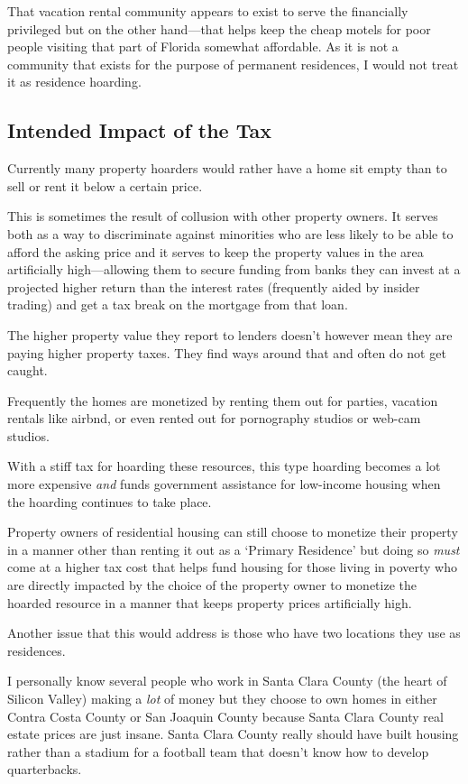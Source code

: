 That vacation rental community appears to exist to serve the financially privileged but on the other hand---that helps keep the cheap motels for poor people visiting that part of Florida somewhat affordable. As it is not a community that exists for the purpose of permanent residences, I would not treat it as residence hoarding.

\subsection{Intended Impact of the Tax}

Currently many property hoarders would rather have a home sit empty than to sell or rent it below a certain price.

This is sometimes the result of collusion with other property owners. It serves both as a way to discriminate against minorities who are less likely to be able to afford the asking price and it serves to keep the property values in the area artificially high---allowing them to secure funding from banks they can invest at a projected higher return than the interest rates (frequently aided by insider trading) and get a tax break on the mortgage from that loan.

The higher property value they report to lenders doesn't however mean they are paying higher property taxes. They find ways around that and often do not get caught.

Frequently the homes are monetized by renting them out for parties, vacation rentals like airbnd\textregistered{}, or even rented out for pornography studios or web-cam studios.

With a stiff tax for hoarding these resources, this type hoarding becomes a lot more expensive \emph{and} funds government assistance for low-income housing when the hoarding continues to take place.

Property owners of residential housing can still choose to monetize their property in a manner other than renting it out as a `Primary Residence' but doing so \emph{must} come at a higher tax cost that helps fund housing for those living in poverty who are directly impacted by the choice of the property owner to monetize the hoarded resource in a manner that keeps property prices artificially high.

Another issue that this would address is those who have two locations they use as residences.

I personally know several people who work in Santa Clara County (the heart of Silicon Valley) making a \emph{lot} of money but they choose to own homes in either Contra Costa County or San Joaquin County because Santa Clara County real estate prices are just insane. Santa Clara County really should have built housing rather than a stadium for a football team that doesn't know how to develop quarterbacks.

